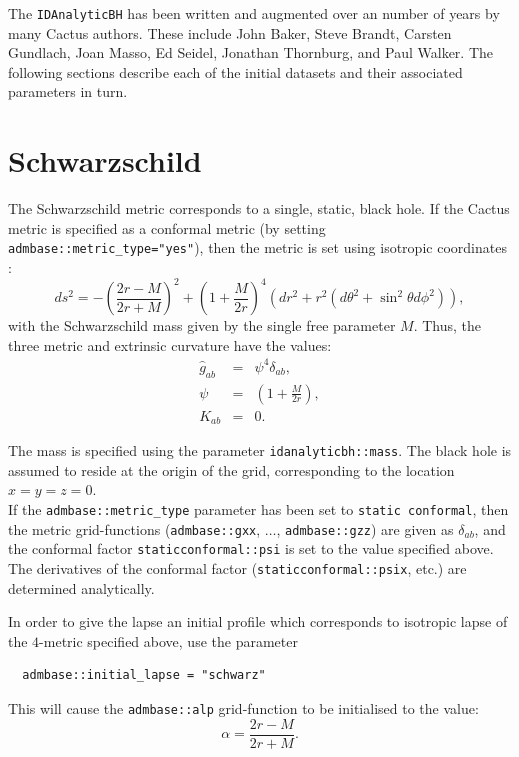 \documentclass{article}
\begin{document}
The \texttt{IDAnalyticBH} has been written and augmented over an number of
years by many Cactus authors. These include John Baker, Steve Brandt,
Carsten Gundlach, Joan Masso, Ed Seidel, Jonathan Thornburg, and
Paul Walker.
The following sections describe each of the initial datasets
and their associated parameters in turn.

\section{Schwarzschild}

The Schwarzschild metric corresponds to a single, static, black hole.
If the Cactus metric is specified as a conformal metric (by setting
\texttt{admbase::metric\_type="yes"}), then the metric is
set using isotropic coordinates \cite{CactusEinstein_IDAnalyticBH_mtw-isotropic}:
\begin{equation}
  ds^2 = -\left(\frac{2r - M}{2r + M}\right)^2
  + \left(1 + \frac{M}{2r}\right)^4 \left(dr^2 + r^2(d\theta^2
  + \sin^2\theta d\phi^2)\right),
\end{equation}
with the Schwarzschild mass given by the single free parameter $M$.
Thus, the three metric and extrinsic curvature have the values:
\begin{eqnarray}
  \hat{g}_{ab} & = & \psi^4 \delta_{ab}, \\
  \psi & = & (1 + \frac{M}{2r}), \\
  K_{ab} & = & 0.
\end{eqnarray}

The mass is specified using the parameter
\texttt{idanalyticbh::mass}. The black hole is assumed to reside at
the origin of the grid, corresponding to the location $x=y=z=0$.\\

If the \texttt{admbase::metric\_type} parameter has been set to {\tt static conformal}, then
the metric grid-functions (\texttt{admbase::gxx}, $\ldots$,
\texttt{admbase::gzz}) are given as $\delta_{ab}$, and the conformal
factor \texttt{staticconformal::psi} is set to the value specified
above. The derivatives of the conformal factor
(\texttt{staticconformal::psix}, etc.) are determined analytically.

In order to give the lapse an initial profile which corresponds to
isotropic lapse of the $4$-metric specified above, use the parameter
\begin{verbatim}
  admbase::initial_lapse = "schwarz"
\end{verbatim}
This will cause the \texttt{admbase::alp} grid-function to be
initialised to the value:
\begin{equation}
  \alpha = \frac{2r - M}{2r + M}.
\end{equation}\\
\end{document}
